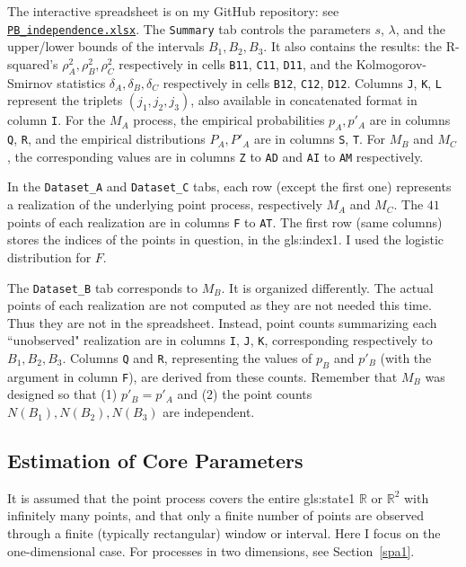 \documentclass[10pt]{article}
\begin{document}
\noindent The interactive spreadsheet is on my GitHub repository:
see  \href{https://github.com/VincentGranville/Point-Processes/tree/main/Spreadsheets}{\texttt{PB\_independence.xlsx}}. The \texttt{Summary} tab controls the parameters $s$, $\lambda$, and the upper/lower bounds of the intervals $B_1,B_2,B_3$. It also contains
the results: the R-squared's $\rho_A^2,\rho_B^2,\rho_C^2$ respectively in cells \texttt{B11}, \texttt{C11}, \texttt{D11}, and
the Kolmogorov-Smirnov statistics $\delta_A,\delta_B,\delta_C$ respectively in cells \texttt{B12}, \texttt{C12}, \texttt{D12}.  Columns \texttt{J}, \texttt{K}, \texttt{L} represent the triplets
$(j_1,j_2,j_3)$, also available in concatenated format in column \texttt{I}. For the $M_A$ process, the
empirical probabilities $p_A,p'_A$ are
in columns \texttt{Q}, \texttt{R}, and the empirical distributions $P_A,P'_A$ are in columns \texttt{S}, \texttt{T}. For $M_B$ and $M_C$, the corresponding values are in
columns \texttt{Z} to \texttt{AD} and \texttt{AI} to \texttt{AM} respectively.

In the \texttt{Dataset\_A} and \texttt{Dataset\_C} tabs, each row (except the first one) represents a realization of the underlying point process, respectively
$M_A$ and $M_C$. The $41$ points of each realization are in columns \texttt{F} to \texttt{AT}.  The first row (same columns) stores the indices of the points in question, in the \gls{gls:index1}. I used the logistic distribution for $F$.

The \texttt{Dataset\_B} tab corresponds to $M_B$. It is organized
differently. The actual points of each realization are not computed as they are not needed this time. Thus they are not in the spreadsheet. Instead, point counts summarizing each ``unobserved" realization are in columns \texttt{I}, \texttt{J}, \texttt{K}, corresponding respectively to $B_1, B_2, B_3$.
Columns \texttt{Q} and \texttt{R}, representing the values of $p_B$ and $p'_B$ (with the argument in column \texttt{F}), are derived from these counts. Remember that $M_B$ was designed so that (1) $p'_B=p'_A$ and (2) the point counts $N(B_1), N(B_2), N(B_3)$ are independent.


\subsection{Estimation of Core Parameters}\label{estpar}
It is assumed that the point process covers the entire \gls{gls:state1} $\mathbb{R}$ or $\mathbb{R}^2$ with infinitely many points,  and that only a finite number of points are observed through a finite (typically rectangular) window or interval.  Here I focus on the one-dimensional case. For processes in two dimensions, see Section~\ref{spa1}.
\end{document}
